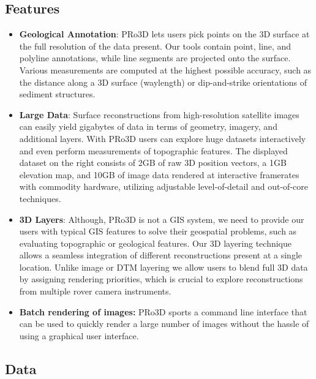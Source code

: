 \subsection{Features}
\label{sec:features}

\begin{itemize}
	\item \textbf{Geological Annotation}: PRo3D lets users pick points on the 3D surface at the full resolution of the data present. Our tools contain point, line, and polyline annotations, while line segments are projected onto the surface. Various measurements are computed at the highest possible accuracy, such as the distance along a 3D surface (waylength) or dip-and-strike orientations of sediment structures. 
	\item \textbf{Large Data}: Surface reconstructions from high-resolution satellite images can easily yield gigabytes of data in terms of geometry, imagery, and additional layers. With PRo3D users can explore huge datasets interactively and even perform measurements of topographic features. The displayed dataset on the right consists of 2GB of raw 3D position vectors, a 1GB elevation map, and 10GB of image data rendered at interactive framerates with commodity hardware, utilizing adjustable level-of-detail and out-of-core techniques. 
	\item \textbf{3D Layers}: Although, PRo3D is not a GIS system, we need to provide our users with typical GIS features to solve their geospatial problems, such as evaluating topographic or geological features. Our 3D layering technique allows a seamless integration of different reconstructions present at a single location. Unlike image or DTM layering we allow users to blend full 3D data by assigning rendering priorities, which is crucial to explore reconstructions from multiple rover camera instruments. 
	\item \textbf{Batch rendering of images:} PRo3D sports a command line interface that can be used to quickly render a large number of images without the hassle of using a graphical user interface.
\end{itemize}
\subsection{Data}
\label{sec:data}


